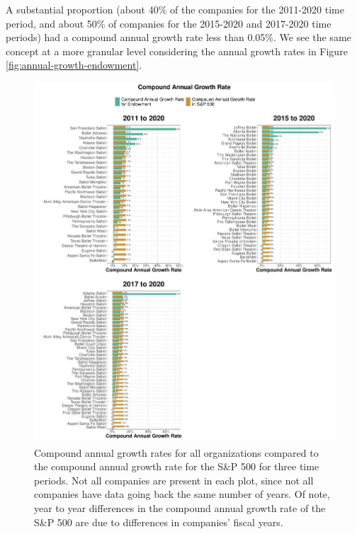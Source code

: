 \documentclass[Dance Data
Project,article,submit,moreauthors,pdftex]{mdpi}
\begin{document}
A substantial proportion (about 40\% of the companies for the 2011-2020
time period, and about 50\% of companies for the 2015-2020 and 2017-2020
time periods) had a compound annual growth rate less than 0.05\%. We see
the same concept at a more granular level considering the annual growth
rates in Figure \ref{fig:annual-growth-endowment}.

\begin{figure}[H]
\includegraphics[width=0.9\linewidth,]{../images/compound-growth} \caption{\label{fig:compound-growth}Compound annual growth rates for all organizations compared to the compound annual growth rate for the S\&P 500 for three time periods. Not all companies are present in each plot, since not all companies have data going back the same number of years. Of note, year to year differences in the compound annual growth rate of the S\&P 500 are due to differences in companies' fiscal years.}\label{fig:unnamed-chunk-9}
\end{figure}
\end{document}

